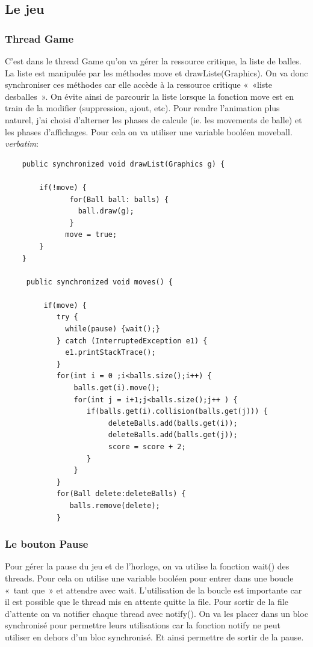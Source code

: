 \documentclass{article}
\begin{document}
\subsection{Le jeu}

\subsubsection{Thread Game}
C’est dans le thread Game qu’on va gérer la ressource critique, la liste de balles. La liste est manipulée par les méthodes move et drawListe(Graphics). On va donc synchroniser ces méthodes car elle accède à la ressource critique « «liste desballes ». On évite ainsi de parcourir la liste lorsque la fonction move est en train de la modifier (suppression, ajout, etc).
Pour rendre l’animation plus naturel, j’ai choisi d’alterner les phases de calcule (ie. les movements de balle) et les phases d’affichages. Pour cela on va utiliser une variable booléen moveball.
\textit{verbatim}:
\begin{verbatim}
    public synchronized void drawList(Graphics g) {
		
        if(!move) {
               for(Ball ball: balls) {
                 ball.draw(g);
               }
              move = true;
        }
    }
	
     public synchronized void moves() {
		
         if(move) {
            try {
              while(pause) {wait();}
            } catch (InterruptedException e1) {
              e1.printStackTrace();
            }
            for(int i = 0 ;i<balls.size();i++) {
                balls.get(i).move();
                for(int j = i+1;j<balls.size();j++ ) {
                   if(balls.get(i).collision(balls.get(j))) {
                        deleteBalls.add(balls.get(i));
                        deleteBalls.add(balls.get(j));
                        score = score + 2;
                   }
                }
            }
            for(Ball delete:deleteBalls) {
               balls.remove(delete);
            }
\end{verbatim}
\subsubsection{Le bouton Pause}
Pour gérer la pause du jeu et de l’horloge, on va utilise la fonction wait() des threads. Pour cela on utilise une variable booléen pour entrer dans une boucle « tant que » et attendre avec wait. L’utilisation de la boucle est importante car il est possible que le thread mis en attente quitte la file. Pour sortir de la file d’attente on va notifier chaque thread avec notify(). On va les placer dans un bloc synchronisé pour permettre leurs utilisations car la fonction notify ne peut utiliser en dehors d’un bloc synchronisé. Et ainsi permettre de sortir de la pause.
\end{document}
